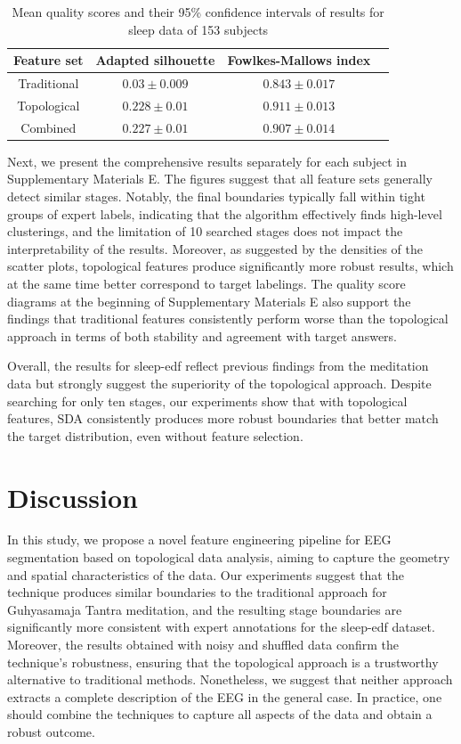 \documentclass[pdflatex,sn-basic,Numbered]{sn-jnl}
\begin{document}
\begin{table}
\caption{Mean quality scores and their 95\% confidence intervals of results for sleep data of 153 subjects}
\label{table2}
\begin{tabular}{cccc}
  \toprule
    Feature set & Adapted silhouette & Fowlkes-Mallows index \\
  \midrule
    Traditional & $0.03 \pm 0.009$  & $0.843 \pm 0.017$ \\
    Topological & $0.228 \pm 0.01 $ & $0.911 \pm 0.013$ \\
    Combined &  $0.227 \pm 0.01 $ & $0.907 \pm 0.014$ \\
  \bottomrule
\end{tabular}
\end{table}

Next, we present the comprehensive results separately for each subject in Supplementary Materials E. The figures suggest that all feature sets generally detect similar stages. Notably, the final boundaries typically fall within tight groups of expert labels, indicating that the algorithm effectively finds high-level clusterings, and the limitation of 10 searched stages does not impact the interpretability of the results. Moreover, as suggested by the densities of the scatter plots, topological features produce significantly more robust results, which at the same time better correspond to target labelings. The quality score diagrams at the beginning of Supplementary Materials E also support the findings that traditional features consistently perform worse than the topological approach in terms of both stability and agreement with target answers.

Overall, the results for sleep-edf reflect previous findings from the meditation data but strongly suggest the superiority of the topological approach. Despite searching for only ten stages, our experiments show that with topological features, SDA consistently produces more robust boundaries that better match the target distribution, even without feature selection.\@

\section{Discussion}

In this study, we propose a novel feature engineering pipeline for EEG segmentation based on topological data analysis, aiming to capture the geometry and spatial characteristics of the data. Our experiments suggest that the technique produces similar boundaries to the traditional approach for Guhyasamaja Tantra meditation, and the resulting stage boundaries are significantly more consistent with expert annotations for the sleep-edf dataset. Moreover, the results obtained with noisy and shuffled data confirm the technique's robustness, ensuring that the topological approach is a trustworthy alternative to traditional methods. Nonetheless, we suggest that neither approach extracts a complete description of the EEG in the general case. In practice, one should combine the techniques to capture all aspects of the data and obtain a robust outcome.
\end{document}
